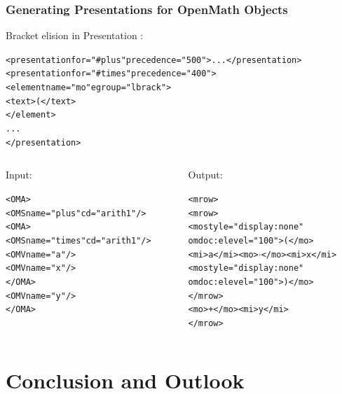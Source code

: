 \documentclass[pdftex,xcolor=svgnames]{beamer}
\begin{document}
\begin{frame}[fragile]
  \frametitle{Generating Presentations for OpenMath Objects}
  Bracket elision in Presentation {\mathml}:
{\scriptsize
\begin{alltt}
<presentation \textcolor{DarkRed!75}{for="#plus"} precedence="500">...</presentation>
<presentation \textcolor{DarkRed!75}{for="#times"} precedence="400">
  \textcolor{DarkGoldenrod!75}{<element name="mo" egroup="lbrack">
    <text>(</text>
  </element>}
  ...
</presentation>
\end{alltt}}
  \begin{columns}[T]
    \begin{column}{.5\textwidth}
      \footnotesize Input:
\scriptsize
\begin{alltt}
<OMA>
  \textcolor{DarkRed!75}{<OMS name="plus" cd="arith1"/>}
  <OMA>
    \textcolor{DarkRed!75}{<OMS name="times" cd="arith1"/>}
    <OMV name="a"/>
    <OMV name="x"/>
  </OMA>
  <OMV name="y"/>
</OMA>
\end{alltt}
    \end{column}
    \begin{column}{.5\textwidth}
      {\footnotesize Output:}
{\scriptsize
\begin{alltt}
<mrow>
  <mrow>
    \textcolor{DarkGoldenrod!75}{<mo style="display:none"
     omdoc:elevel="100">(</mo>}
    <mi>a</mi>\textcolor{DarkRed!75}{<mo>\(\cdot\)</mo>}<mi>x</mi>
    \textcolor{DarkGoldenrod!75}{<mo style="display:none"
     omdoc:elevel="100">)</mo>}
  </mrow>
  \textcolor{DarkRed!75}{<mo>+</mo>}<mi>y</mi>
</mrow>
\end{alltt}}
    \end{column}
  \end{columns}
\end{frame}

\section{Conclusion and Outlook}
\label{sec:conc}

\end{document}
